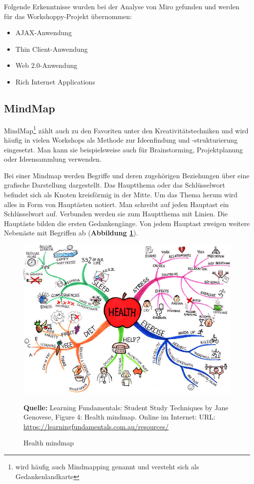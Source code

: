 Folgende Erkenntnisse wurden bei der Analyse von Miro gefunden und werden für das Workshoppy-Projekt übernommen: 
\begin{itemize}
\item AJAX-Anwendung
\item Thin Client-Anwendung
\item Web 2.0-Anwendung
\item Rich Internet Applications
\end{itemize}

\subsection{MindMap}
\label{sec:mindmap}
MindMap\footnote{wird häufig auch Mindmapping genannt und versteht sich als Gedankenlandkarte} zählt auch zu den Favoriten unter den Kreativitätstechniken und wird häufig in vielen Workshops als Methode zur Ideenfindung und -strukturierung eingesetzt. Man kann sie beispielsweise auch für Brainstorming, Projektplanung oder Ideensammlung verwenden.\bigskip

Bei einer Mindmap werden Begriffe und deren zugehörigen Beziehungen über eine grafische Darstellung dargestellt. Das Hauptthema oder das Schlüsselwort befindet sich als Knoten kreisförmig in der Mitte. Um das Thema herum wird alles in Form von Hauptästen notiert. Man schreibt auf jeden Hauptast ein Schlüsselwort auf. Verbunden werden sie zum Hauptthema mit Linien. Die Hauptäste bilden die ersten Gedankengänge. Von jedem Hauptast zweigen weitere Nebenäste mit Begriffen ab (\textbf{Abbildung \ref{fig:mindmap}}). 

\begin{figure}[H]
  \begin{center}
    \includegraphics[scale=1.8]{img/health-mindmap}
	\caption{Health mindmap} 
	\footnotesize\sffamily\textbf{Quelle:} Learning Fundamentals: Student Study Techniques by Jane Genovese, Figure 4: Health
mindmap. Online im Internet: URL: \url{https://learningfundamentals.com.au/resources/}  
	\label{fig:mindmap}
  \end{center}   
\end{figure}

